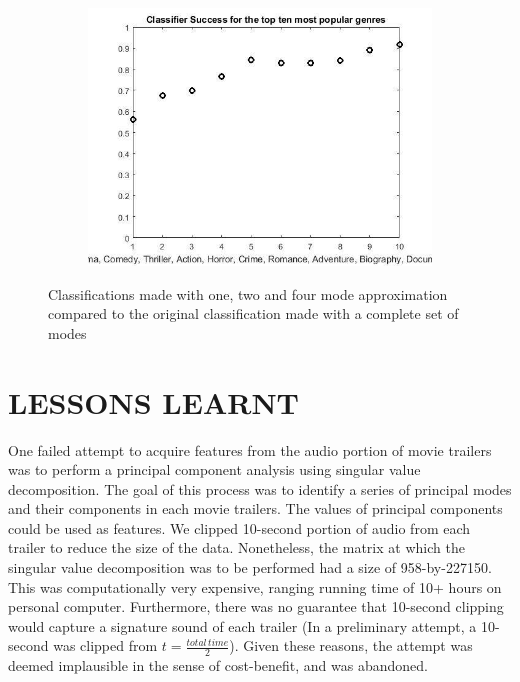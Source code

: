 \documentclass[letterpaper, 10 pt, conference]{ieeeconf}  %
\begin{document}
\begin{figure}
\begin{subfigure}[b]{0.475\textwidth}
	\end{subfigure}
	\quad
	\begin{subfigure}[b]{0.475\textwidth}   
		\centering 
		\includegraphics[width=\textwidth]{orig_mode}
	\end{subfigure}
	\caption{Classifications made with one, two and four mode approximation compared to the original classification made with a complete set of modes} 
	\label{f:modal_redx}
\end{figure}

\twocolumn

\section{LESSONS LEARNT}
One failed attempt to acquire features from the audio portion of movie trailers was to perform a principal component analysis using singular value decomposition. The goal of this process was to identify a series of principal modes and their components in each movie trailers. The values of principal components could be used as features. We clipped  10-second portion of audio from each trailer to reduce the size of the data. Nonetheless, the matrix at which the singular value decomposition was to be performed had a size of 958-by-227150. This was computationally very expensive, ranging running time of 10+ hours on personal computer. Furthermore, there was no guarantee that 10-second clipping would capture a signature sound of each trailer (In a preliminary attempt, a 10-second was clipped from $t=\frac{total\, time}{2}$). Given these reasons, the attempt was deemed implausible in the sense of cost-benefit, and was abandoned.
\end{document}

